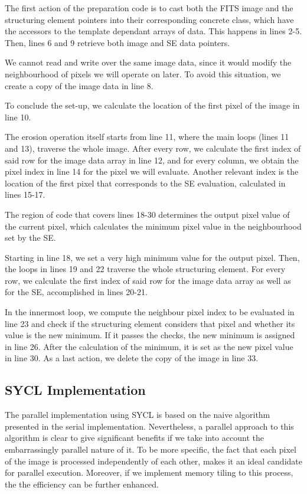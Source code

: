 The first action of the preparation code is to cast both the FITS image and the structuring element pointers into their corresponding concrete class, which have the accessors to the template dependant arrays of data.
This happens in lines 2-5.
Then, lines 6 and 9 retrieve both image and SE data pointers.

We cannot read and write over the same image data, since it would modify the neighbourhood of pixels we will operate on later.
To avoid this situation, we create a copy of the image data in line 8.

To conclude the set-up, we calculate the location of the first pixel of the image in line 10.

The erosion operation itself starts from line 11, where the main loops (lines 11 and 13), traverse the whole image.
After every row, we calculate the first index of said row for the image data array in line 12, and for every column, we obtain the pixel index in line 14 for the pixel we will evaluate.
Another relevant index is the location of the first pixel that corresponds to the SE evaluation, calculated in lines 15-17.

The region of code that covers lines 18-30 determines the output pixel value of the current pixel, which calculates the minimum pixel value in the neighbourhood set by the SE.

Starting in line 18, we set a very high minimum value for the output pixel.
Then, the loops in lines 19 and 22 traverse the whole structuring element.
For every row, we calculate the first index of said row for the image data array as well as for the SE, accomplished in lines 20-21.

In the innermost loop, we compute the neighbour pixel index to be evaluated in line 23 and check if the structuring element considers that pixel and whether its value is the new minimum.
If it passes the checks, the new minimum is assigned in line 26.
After the calculation of the minimum, it is set as the new pixel value in line 30.
As a last action, we delete the copy of the image in line 33.

\subsection{SYCL Implementation}

The parallel implementation using SYCL is based on the naive algorithm presented in the serial implementation.
Nevertheless, a parallel approach to this algorithm is clear to give significant benefits if we take into account the embarrassingly parallel nature of it.
To be more specific, the fact that each pixel of the image is processed independently of each other, makes it an ideal candidate for parallel execution.
Moreover, if we implement memory tiling to this process, the the efficiency can be further enhanced.

